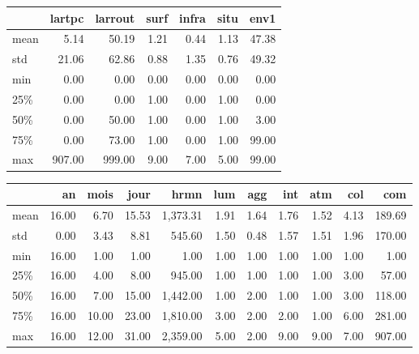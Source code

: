 \documentclass[a4paper]{article}
\theoremstyle{definition}
\theoremstyle{proposition}
\begin{document}
\begin{tabular}{lrrrrrr}
\toprule
{} &    lartpc &   larrout &      surf &     infra &      situ &      env1 \\
\midrule
mean  &      5.14 &     50.19 &      1.21 &      0.44 &      1.13 &     47.38 \\
std   &     21.06 &     62.86 &      0.88 &      1.35 &      0.76 &     49.32 \\
min   &      0.00 &      0.00 &      0.00 &      0.00 &      0.00 &      0.00 \\
25\%   &      0.00 &      0.00 &      1.00 &      0.00 &      1.00 &      0.00 \\
50\%   &      0.00 &     50.00 &      1.00 &      0.00 &      1.00 &      3.00 \\
75\%   &      0.00 &     73.00 &      1.00 &      0.00 &      1.00 &     99.00 \\
max   &    907.00 &    999.00 &      9.00 &      7.00 &      5.00 &     99.00 \\
\bottomrule
\end{tabular}

\vspace{0.5cm}


\begin{tabular}{lrrrrrrrrrr}
\toprule
{} &        an &      mois &      jour &      hrmn &       lum &       agg &       int &       atm &       col &       com \\
\midrule
mean  &     16.00 &      6.70 &     15.53 &  1,373.31 &      1.91 &      1.64 &      1.76 &      1.52 &      4.13 &    189.69 \\
std   &      0.00 &      3.43 &      8.81 &    545.60 &      1.50 &      0.48 &      1.57 &      1.51 &      1.96 &    170.00 \\
min   &     16.00 &      1.00 &      1.00 &      1.00 &      1.00 &      1.00 &      1.00 &      1.00 &      1.00 &      1.00 \\
25\%   &     16.00 &      4.00 &      8.00 &    945.00 &      1.00 &      1.00 &      1.00 &      1.00 &      3.00 &     57.00 \\
50\%   &     16.00 &      7.00 &     15.00 &  1,442.00 &      1.00 &      2.00 &      1.00 &      1.00 &      3.00 &    118.00 \\
75\%   &     16.00 &     10.00 &     23.00 &  1,810.00 &      3.00 &      2.00 &      2.00 &      1.00 &      6.00 &    281.00 \\
max   &     16.00 &     12.00 &     31.00 &  2,359.00 &      5.00 &      2.00 &      9.00 &      9.00 &      7.00 &    907.00 \\
\bottomrule
\end{tabular}
\end{document}
